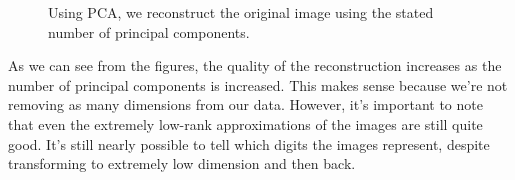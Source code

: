 \documentclass[12pt]{article}
\begin{document}
	\begin{figure}[H]
		\centering
	\end{figure}
	\begin{figure}[H]
		\centering
		\caption{Using PCA, we reconstruct the original image using the stated number of principal components.}
	\end{figure}
	As we can see from the figures, the quality of the reconstruction increases as the number of principal components is increased. This makes sense because we're not removing as many dimensions from our data. However, it's important to note that even the extremely low-rank approximations of the images are still quite good. It's still nearly possible to tell which digits the images represent, despite transforming to extremely low dimension and then back.
	
	
\end{document}
